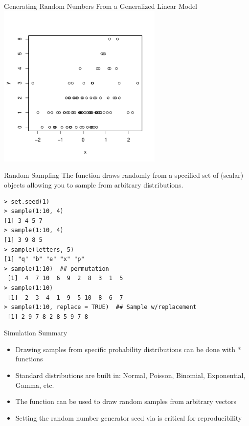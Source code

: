 \documentclass[aspectratio=169]{beamer}
\begin{document}
\begin{frame}[fragile]{Generating Random Numbers From a Generalized Linear Model}
\includegraphics[height=3.2in]{simpoisson}
\end{frame}

\begin{frame}[fragile]{Random Sampling}
  The  function draws randomly from a specified set of
  (scalar) objects allowing you to sample from arbitrary
  distributions.
\begin{verbatim}
> set.seed(1)
> sample(1:10, 4)
[1] 3 4 5 7
> sample(1:10, 4)
[1] 3 9 8 5
> sample(letters, 5)
[1] "q" "b" "e" "x" "p"
> sample(1:10)  ## permutation
 [1]  4  7 10  6  9  2  8  3  1  5
> sample(1:10)
 [1]  2  3  4  1  9  5 10  8  6  7
> sample(1:10, replace = TRUE)  ## Sample w/replacement
 [1] 2 9 7 8 2 8 5 9 7 8
\end{verbatim}
\end{frame}

\begin{frame}{Simulation}
Summary
\begin{itemize}
\item Drawing samples from specific probability distributions can be
  done with * functions
\item Standard distributions are built in: Normal, Poisson, Binomial,
  Exponential, Gamma, etc.
\item The  function can be used to draw random samples
  from arbitrary vectors
\item Setting the random number generator seed via  is
  critical for reproducibility
\end{itemize}
\end{frame}
\end{document}
